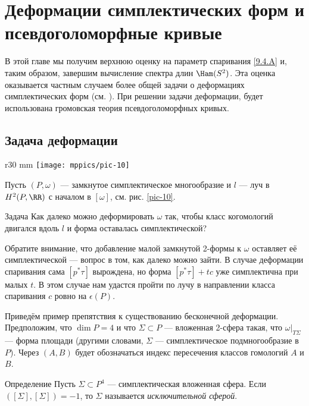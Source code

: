 \chapter[Деформации симплектических форм]{Деформации симплектических форм и псевдоголоморфные кривые}

В этой главе мы получим верхнюю оценку на параметр спаривания \ref{9.4.A} и, таким образом,
завершим вычисление спектра длин $\Ham(S^2)$.
Эта оценка оказывается частным случаем более общей задачи о деформациях симплектических форм (см. \cite{P7}).
При решении задачи деформации, будет использована громовская теория псевдоголоморфных кривых.

\section{Задача деформации}

\begin{wrapfigure}[8]{r}{30 mm}
\vskip-6mm
\centering
\texttt{[image: mppics/pic-10]}
\caption{}\label{pic-10}
\vskip0mm
\end{wrapfigure}

Пусть $(P, \omega)$ --- замкнутое симплектическое многообразие и $l$ --- луч в $H^2 (P, \RR)$ с началом в $[\omega]$, см. рис. \ref{pic-10}.

\begin{ex*}{Задача}
Как далеко можно деформировать $\omega$ так, чтобы класс когомологий двигался вдоль $l$ и форма оставалась симплектической? 
\end{ex*}

Обратите внимание, что добавление малой замкнутой 2-формы к $\omega$ оставляет её симплектической --- вопрос в том, как далеко можно зайти.
В случае деформации спаривания сама  $[p^\ast \tau]$ вырождена, но форма $[p^\ast \tau ] + tc$ уже симплектична при малых $t$.
В этом случае нам удастся пройти по лучу в направлении класса спаривания $c$ ровно на $\epsilon(P)$.

Приведём пример препятствия к существованию бесконечной деформации.
Предположим, что $\dim P = 4$ и что $\Sigma \subset P$ --- вложенная 2-сфера такая, что $\omega|_{T \Sigma}$ --- форма площади (другими словами, $\Sigma$ --- симплектическое подмногообразие в $P$).
Через $(A, B)$ будет обозначаться индекс пересечения классов гомологий $A$ и $B$.

\begin{ex*}{Определение}
Пусть $\Sigma \subset P^4$ --- симплектическая вложенная сфера.
Если $([\Sigma], [\Sigma]) = -1$, то $\Sigma$ называется \emph{исключительной сферой}.
\end{ex*}

